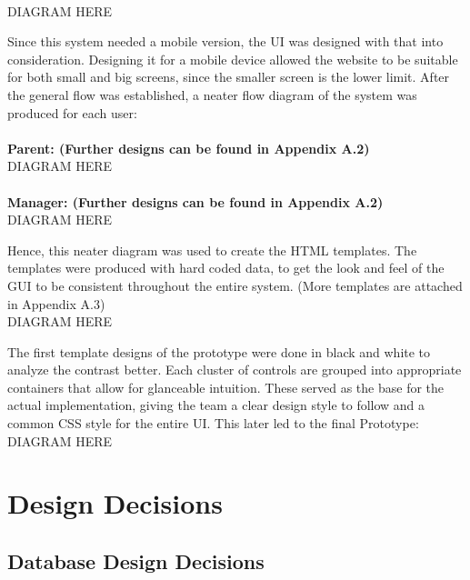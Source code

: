 \documentclass{l3proj}
\begin{document}
\\ 
{\LARGE{DIAGRAM HERE}}\\
\par 
Since this system needed a mobile version, the UI was designed with that into consideration. Designing it for a mobile device allowed the website to be suitable for both small and big screens, since the smaller screen is the lower limit. After the general flow was established, a neater flow diagram of the system was produced for each user:\\
\\ \textbf{Parent: (Further designs can be found in Appendix A.2)}\\
{\LARGE{DIAGRAM HERE}}
\\
\\ \textbf{Manager: (Further designs can be found in Appendix A.2)}
\\ 
{\LARGE{DIAGRAM HERE}}
\par 
Hence, this neater diagram was used to create the HTML templates. The templates were produced with hard coded data, to get the look and feel of the GUI to be consistent throughout the entire system. (More templates are attached in Appendix A.3)
\\ 
{\LARGE{DIAGRAM HERE}}
\par 
The first template designs of the prototype were done in black and white to analyze the contrast better. Each cluster of controls are grouped into appropriate containers that allow for glanceable intuition. These served as the base for the actual implementation, giving the team a clear design style to follow and a common CSS style for the entire UI. This later led to the final Prototype:
\\ 
{\LARGE{DIAGRAM HERE}}
\\


\section{Design Decisions}

\subsection{Database Design Decisions}

\end{document}
